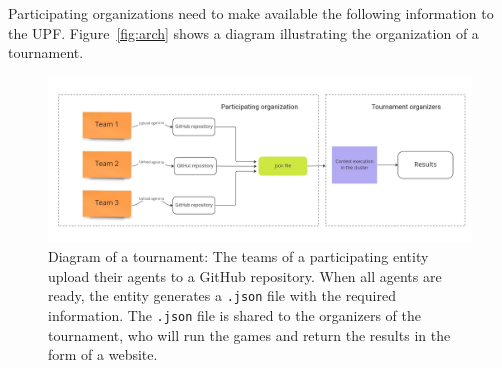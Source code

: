 \documentclass[11pt]{article}
\begin{document}


Participating organizations need to make available the following information to the UPF.
Figure~\ref{fig:arch} shows a diagram illustrating the organization of a tournament.
\begin{figure}[h!]
    \center 
    \includegraphics[width=\textwidth]{scheme.jpg} 
    \caption{Diagram of a tournament: The teams of a participating entity upload their agents to a GitHub repository. When all agents are ready, the entity generates a \texttt{.json} file with the required information. The \texttt{.json} file is shared to the organizers of the tournament, who will run the games and return the results in the form of a website.}
\end{figure}\label{fig:arch}
\end{document}
